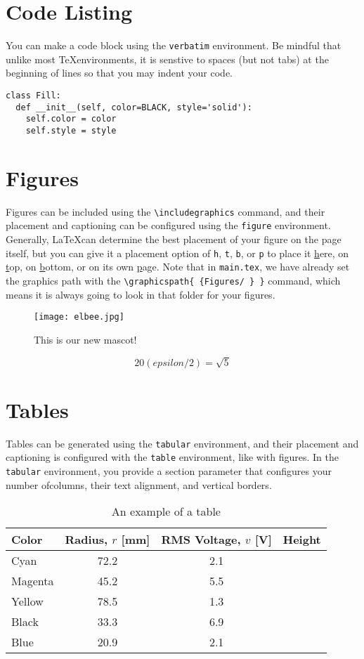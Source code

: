 \section*{Code Listing}
You can make a code block using the \texttt{verbatim} environment. Be mindful that unlike most \TeX environments, it is senstive to spaces (but not tabs) at the beginning of lines so that you may indent your code.
\begin{verbatim}
class Fill:
  def __init__(self, color=BLACK, style='solid'):
    self.color = color
    self.style = style
\end{verbatim}

\section*{Figures}
Figures can be included using the \texttt{\textbackslash includegraphics} command, and their placement and captioning can be configured using the \texttt{figure} environment. Generally, \LaTeX can determine the best placement of your figure on the page itself, but you can give it a placement option of \texttt{h}, \texttt{t}, \texttt{b}, or \texttt{p} to place it \underline{h}ere, on \underline{t}op, on \underline{b}ottom, or on its own \underline{p}age. Note that in \texttt{main.tex}, we have already set the graphics path with the \texttt{\textbackslash graphicspath\{ \{Figures/ \} \}} command, which means it is always going to look in that folder for your figures.

\begin{figure}[ht]
	\centering
	\texttt{[image: elbee.jpg]}
	\caption{This is our new mascot!}
	\label{fig:exampleFig}
\end{figure}

$$20 (epsilon / 2) = \sqrt{5}$$

\section*{Tables}
Tables can be generated using the \texttt{tabular} environment, and their placement and captioning is configured with the \texttt{table} environment, like with figures. In the \texttt{tabular} environment, you provide a section parameter that configures your number ofcolumns, their text alignment, and vertical borders.

\begin{table}[ht]
	\centering
	\caption{An example of a table}
	\begin{tabular}{l c c c}
		\hline
		Color	&  Radius, $r$ [mm] & RMS Voltage, $v$ [V]  & Height \\
		\hline
		Cyan	&	72.2	&	2.1 \\
		Magenta	&	45.2	&	5.5 \\
		Yellow	&	78.5	&	1.3 \\
		Black	&	33.3	&	6.9 \\
		Blue    &   20.9    &   2.1 \\
		\hline
	\end{tabular}
	\label{tab:exampleTable}
\end{table}

